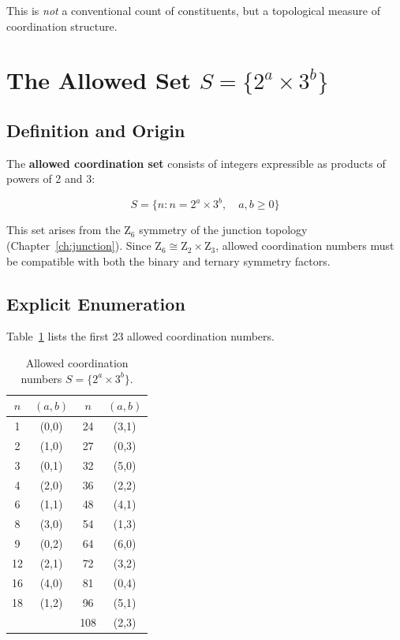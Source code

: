 This is \emph{not} a conventional count of constituents, but a
topological measure of coordination structure. \tagP

\section{The Allowed Set $S = \{2^a \times 3^b\}$}
\label{sec:frustrated:allowed}

\subsection{Definition and Origin}

The \textbf{allowed coordination set} consists of integers expressible as
products of powers of 2 and 3:

\begin{derivationbox}
    \begin{equation}
        S = \{n : n = 2^a \times 3^b, \quad a, b \geq 0\}
        \label{eq:f:allowed_set}
    \end{equation}
    \tagDer
\end{derivationbox}

This set arises from the Z$_6$ symmetry of the junction topology
(Chapter~\ref{ch:junction}). Since $\text{Z}_6 \cong \text{Z}_2 \times \text{Z}_3$,
allowed coordination numbers must be compatible with both the binary and
ternary symmetry factors.

\subsection{Explicit Enumeration}

Table~\ref{tab:f:allowed} lists the first 23 allowed coordination numbers.

\begin{table}[h]
\centering
\caption{Allowed coordination numbers $S = \{2^a \times 3^b\}$.}
\label{tab:f:allowed}
\begin{tabular}{cccc}
    \toprule
    $n$ & $(a, b)$ & $n$ & $(a, b)$ \\
    \midrule
    1 & (0,0) & 24 & (3,1) \\
    2 & (1,0) & 27 & (0,3) \\
    3 & (0,1) & 32 & (5,0) \\
    4 & (2,0) & 36 & (2,2) \\
    6 & (1,1) & 48 & (4,1) \\
    8 & (3,0) & 54 & (1,3) \\
    9 & (0,2) & 64 & (6,0) \\
    12 & (2,1) & 72 & (3,2) \\
    16 & (4,0) & 81 & (0,4) \\
    18 & (1,2) & 96 & (5,1) \\
    & & 108 & (2,3) \\
    \bottomrule
\end{tabular}
\end{table}

